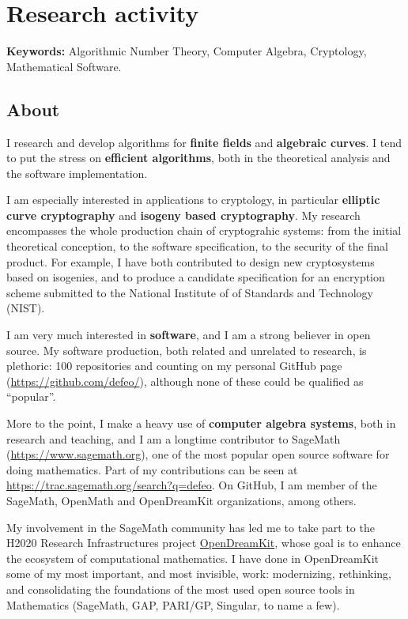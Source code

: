 \documentclass{book}
\begin{document}
\section*{Research activity}

\textbf{Keywords:} Algorithmic Number Theory, Computer Algebra,
Cryptology, Mathematical Software.

\subsection*{About}

I research and develop algorithms for \textbf{finite fields} and
\textbf{algebraic curves}. I tend to put the stress on
\textbf{efficient algorithms}, both in the theoretical analysis and
the software implementation.

I am especially interested in applications to cryptology, in
particular \textbf{elliptic curve cryptography} and \textbf{isogeny
  based cryptography}.  My research encompasses the whole production
chain of cryptograhic systems: from the initial theoretical
conception, to the software specification, to the security of the
final product.  For example, I have both contributed to design new
cryptosystems based on isogenies, and to produce a candidate
specification for an encryption scheme submitted to the National
Institute of of Standards and Technology (NIST).

I am very much interested in \textbf{software}, and I am a strong
believer in open source. My software production, both related and
unrelated to research, is plethoric: 100 repositories and counting on
my personal GitHub page (\url{https://github.com/defeo/}), although
none of these could be qualified as ``popular''.

More to the point, I make a heavy use of \textbf{computer algebra
  systems}, both in research and teaching, and I am a longtime
contributor to SageMath (\url{https://www.sagemath.org}), one of the
most popular open source software for doing mathematics. Part of my
contributions can be seen at
\url{https://trac.sagemath.org/search?q=defeo}. On GitHub, I am member
of the SageMath, OpenMath and OpenDreamKit organizations, among
others.

My involvement in the SageMath community has led me to take part to
the H2020 Research Infrastructures project
\href{https://opendreamkit.org/}{OpenDreamKit}, whose goal is to
enhance the ecosystem of computational mathematics.  I have done in
OpenDreamKit some of my most important, and most invisible, work:
modernizing, rethinking, and consolidating the foundations of the most
used open source tools in Mathematics (SageMath, GAP, PARI/GP,
Singular, to name a few).
\end{document}
